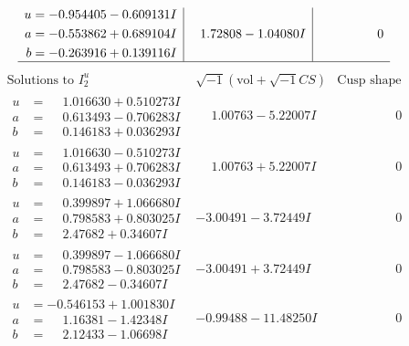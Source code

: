 \documentclass[1p]{elsarticle_modified}
\theoremstyle{definition}
\newcommand{\I}{\sqrt{-1}}
\begin{document}
$$\begin{array}{c|c|c}
\begin{aligned}
u &= -0.954405 - 0.609131 I \\
a &= -0.553862 + 0.689104 I \\
b &= -0.263916 + 0.139116 I\end{aligned}
 & \phantom{-}1.72808 - 1.04080 I & \phantom{-0.000000 } 0\\
 \hline 
 \end{array}$$\newpage$$\begin{array}{c|c|c}  
\text{Solutions to }I^u_{2}& \I (\text{vol} + \sqrt{-1}CS) & \text{Cusp shape}\\
 \hline 
\begin{aligned}
u &= \phantom{-}1.016630 + 0.510273 I \\
a &= \phantom{-}0.613493 - 0.706283 I \\
b &= \phantom{-}0.146183 + 0.036293 I\end{aligned}
 & \phantom{-}1.00763 - 5.22007 I & \phantom{-0.000000 } 0 \\ \hline\begin{aligned}
u &= \phantom{-}1.016630 - 0.510273 I \\
a &= \phantom{-}0.613493 + 0.706283 I \\
b &= \phantom{-}0.146183 - 0.036293 I\end{aligned}
 & \phantom{-}1.00763 + 5.22007 I & \phantom{-0.000000 } 0 \\ \hline\begin{aligned}
u &= \phantom{-}0.399897 + 1.066680 I \\
a &= \phantom{-}0.798583 + 0.803025 I \\
b &= \phantom{-}2.47682 + 0.34607 I\end{aligned}
 & -3.00491 - 3.72449 I & \phantom{-0.000000 } 0 \\ \hline\begin{aligned}
u &= \phantom{-}0.399897 - 1.066680 I \\
a &= \phantom{-}0.798583 - 0.803025 I \\
b &= \phantom{-}2.47682 - 0.34607 I\end{aligned}
 & -3.00491 + 3.72449 I & \phantom{-0.000000 } 0 \\ \hline\begin{aligned}
u &= -0.546153 + 1.001830 I \\
a &= \phantom{-}1.16381 - 1.42348 I \\
b &= \phantom{-}2.12433 - 1.06698 I\end{aligned}
 & -0.99488 - 11.48250 I & \phantom{-0.000000 } 0 \\ \hline\begin{aligned}

\end{aligned}
\end{array}$$
\end{document}
